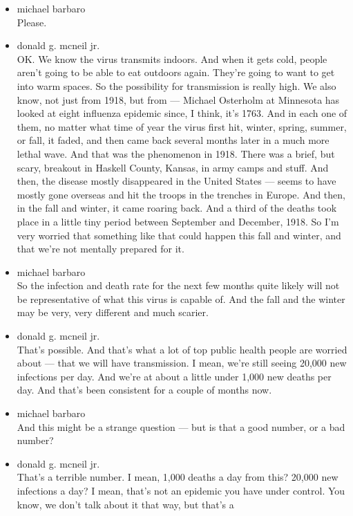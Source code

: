 \begin{itemize}
\item
  michael barbaro\\
  Please.
\item
  donald g. mcneil jr.\\
  OK. We know the virus transmits indoors. And when it gets cold, people
  aren't going to be able to eat outdoors again. They're going to want
  to get into warm spaces. So the possibility for transmission is really
  high. We also know, not just from 1918, but from --- Michael Osterholm
  at Minnesota has looked at eight influenza epidemic since, I think,
  it's 1763. And in each one of them, no matter what time of year the
  virus first hit, winter, spring, summer, or fall, it faded, and then
  came back several months later in a much more lethal wave. And that
  was the phenomenon in 1918. There was a brief, but scary, breakout in
  Haskell County, Kansas, in army camps and stuff. And then, the disease
  mostly disappeared in the United States --- seems to have mostly gone
  overseas and hit the troops in the trenches in Europe. And then, in
  the fall and winter, it came roaring back. And a third of the deaths
  took place in a little tiny period between September and December,
  1918. So I'm very worried that something like that could happen this
  fall and winter, and that we're not mentally prepared for it.
\item
  michael barbaro\\
  So the infection and death rate for the next few months quite likely
  will not be representative of what this virus is capable of. And the
  fall and the winter may be very, very different and much scarier.
\item
  donald g. mcneil jr.\\
  That's possible. And that's what a lot of top public health people are
  worried about --- that we will have transmission. I mean, we're still
  seeing 20,000 new infections per day. And we're at about a little
  under 1,000 new deaths per day. And that's been consistent for a
  couple of months now.
\item
  michael barbaro\\
  And this might be a strange question --- but is that a good number, or
  a bad number?
\item
  donald g. mcneil jr.\\
  That's a terrible number. I mean, 1,000 deaths a day from this? 20,000
  new infections a day? I mean, that's not an epidemic you have under
  control. You know, we don't talk about it that way, but that's a

\end{itemize}
